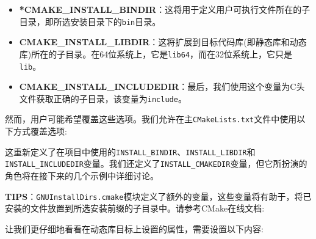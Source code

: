 \begin{itemize}
\item \textbf{*CMAKE\_INSTALL\_BINDIR}：这将用于定义用户可执行文件所在的子目录，即所选安装目录下的\texttt{bin}目录。

\item \textbf{CMAKE\_INSTALL\_LIBDIR}：这将扩展到目标代码库(即静态库和动态库)所在的子目录。在64位系统上，它是\texttt{lib64}，而在32位系统上，它只是\texttt{lib}。

\item \textbf{CMAKE\_INSTALL\_INCLUDEDIR}：最后，我们使用这个变量为C头文件获取正确的子目录，该变量为\texttt{include}。

\end{itemize}

然而，用户可能希望覆盖这些选项。我们允许在主\texttt{CMakeLists.txt}文件中使用以下方式覆盖选项:


这重新定义了在项目中使用的\texttt{INSTALL\_BINDIR}、\texttt{INSTALL\_LIBDIR}和\texttt{INSTALL\_INCLUDEDIR}变量。我们还定义了\texttt{INSTALL\_CMAKEDIR}变量，但它所扮演的角色将在接下来的几个示例中详细讨论。

\begin{myInfoBox}
\textbf{TIPS}：\texttt{GNUInstallDirs.cmake}模块定义了额外的变量，这些变量将有助于，将已安装的文件放置到所选安装前缀的子目录中。请参考CMake在线文档:
\end{myInfoBox}


让我们更仔细地看看在动态库目标上设置的属性，需要设置以下内容:

